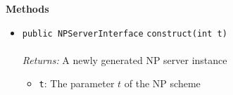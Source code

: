 \textbf{\sffamily Methods}
\begin{itemize}
\item \lstinline|public NPServerInterface| \lstinline|construct|\lstinline|(int t)|\\ \\[-0.6em]
\emph{Returns:} A newly generated NP server instance
\begin{itemize}
\item \lstinline|t|: The parameter $t$ of the NP scheme
\end{itemize}



\end{itemize}



